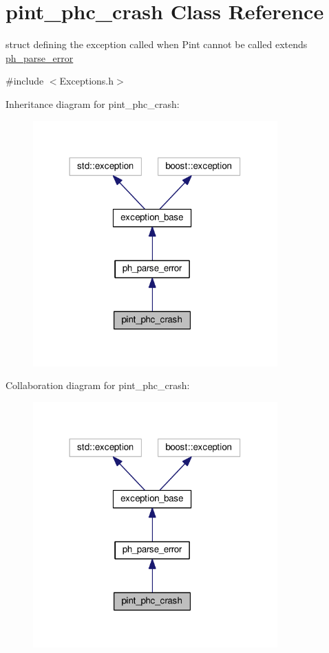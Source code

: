 \hypertarget{structpint__phc__crash}{\section{pint\+\_\+phc\+\_\+crash Class Reference}
\label{structpint__phc__crash}
}


struct defining the exception called when Pint cannot be called extends \hyperlink{structph__parse__error}{ph\+\_\+parse\+\_\+error}  




{\ttfamily \#include $<$Exceptions.\+h$>$}



Inheritance diagram for pint\+\_\+phc\+\_\+crash\+:\nopagebreak
\begin{figure}[H]
\begin{center}
\leavevmode
\includegraphics[width=266pt]{structpint__phc__crash__inherit__graph}
\end{center}
\end{figure}


Collaboration diagram for pint\+\_\+phc\+\_\+crash\+:\nopagebreak
\begin{figure}[H]
\begin{center}
\leavevmode
\includegraphics[width=266pt]{structpint__phc__crash__coll__graph}
\end{center}
\end{figure}


